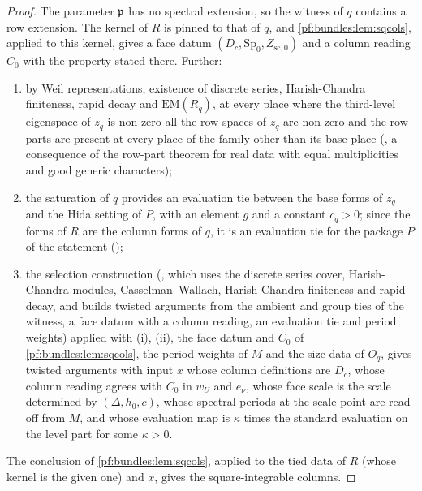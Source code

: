 \begin{proof}
The parameter $\mathfrak p$ has no spectral extension, so the witness of $q$ contains a row extension. The kernel of $R$ is pinned to that of $q$,
and \cref{pf:bundles:lem:sqcols}, applied to this kernel, gives a face datum $(D_c,\mathrm{Sp}_0,Z_{\mathrm{sc},0})$ and a column reading $C_0$
with the property stated there. Further:
\begin{enumerate}[label=(\roman*)]
\item by Weil representations, existence of discrete series, Harish-Chandra finiteness, rapid decay and $\mathrm{EM}(R_q)$, at every place
where the third-level eigenspace of $z_q$ is non-zero all the row spaces of $z_q$ are non-zero and the row parts are present at every place
of the family other than its base place (, a consequence of the
row-part theorem for real data with equal multiplicities and good generic characters);
\item the saturation of $q$ provides an evaluation tie between the base forms of $z_q$ and the Hida setting of $P$, with an element $g$ and a
constant $c_q>0$; since the forms of $R$ are the column forms of $q$, it is an evaluation tie for the package $P$ of the statement
();
\item the selection construction (, which uses the discrete series
cover, Harish-Chandra modules, Casselman--Wallach, Harish-Chandra finiteness and rapid decay, and builds twisted arguments from the ambient and
group ties of the witness, a face datum with a column reading, an evaluation tie and period weights) applied with (i), (ii), the face datum and
$C_0$ of \cref{pf:bundles:lem:sqcols}, the period weights of $M$ and the size data of $O_q$, gives twisted arguments with input $x$ whose column
definitions are $D_c$, whose column reading agrees with $C_0$ in $w_U$ and $e_\nu$, whose face scale is the scale determined by
$(\Delta,h_0,c)$, whose spectral periods at the scale point are read off from $M$, and whose evaluation map is $\kappa$ times the standard
evaluation on the level part for some $\kappa>0$.
\end{enumerate}
The conclusion of \cref{pf:bundles:lem:sqcols}, applied to the tied data of $R$ (whose kernel is the given one) and $x$, gives the
square-integrable columns.
\end{proof}

